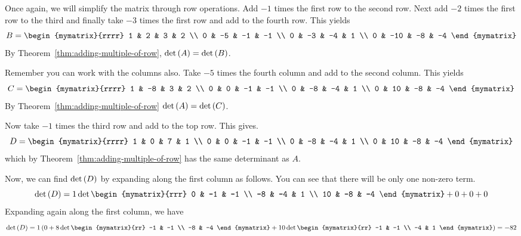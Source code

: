 \begin{solution} 
Once again, we will simplify the matrix through row operations. 
Add $-1$ times the first row to
the second row. Next add $-2$ times the first row to the third and finally take
$-3$ times the first row and add to the fourth row. This yields
\begin{equation*}
B = \begin{mymatrix}{rrrr}
1 & 2 & 3 & 2 \\
0 & -5 & -1 & -1 \\
0 & -3 & -4 & 1 \\
0 & -10 & -8 & -4
\end{mymatrix} 
\end{equation*}
By Theorem~\ref{thm:adding-multiple-of-row}, $\det \left(A\right) = \det \left(B\right)$. 

Remember you can work with the columns also. Take $-5$
times the fourth column and add to the second column. This yields
\begin{equation*}
C = \begin{mymatrix}{rrrr}
1 & -8 & 3 & 2 \\
0 & 0 & -1 & -1 \\
0 & -8 & -4 & 1 \\
0 & 10 & -8 & -4
\end{mymatrix}
\end{equation*}
By Theorem~\ref{thm:adding-multiple-of-row} $\det \left(A\right) = \det \left(C\right)$. 

Now take $-1$ times the third row and add to
the top row. This gives.
\begin{equation*}
D = \begin{mymatrix}{rrrr}
1 & 0 & 7 & 1 \\
0 & 0 & -1 & -1 \\
0 & -8 & -4 & 1 \\
0 & 10 & -8 & -4
\end{mymatrix}
\end{equation*}
which by Theorem~\ref{thm:adding-multiple-of-row} has the same determinant as $A$.

Now, we can find $\det \left(D\right)$ by expanding along the first column as follows. You can see that there will be only one non-zero term.
\begin{equation*}
\det \tup{D} = 1 \det \begin{mymatrix}{rrr}
0 & -1 & -1 \\
-8 & -4 & 1 \\
10 & -8 & -4
\end{mymatrix}
+ 0 + 0 + 0 
\end{equation*}
Expanding again along the first column, we have
\begin{equation*}
\det \tup{D} 
=
1 \tup{0 +  8\det \begin{mymatrix}{rr}
-1 & -1 \\
-8 & -4
\end{mymatrix} +10\det \begin{mymatrix}{rr}
-1 & -1 \\
-4 & 1
\end{mymatrix} } = -82
\end{equation*}


\end{solution}
